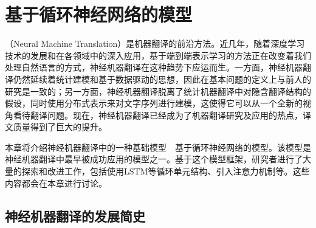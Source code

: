 
%


\renewcommand\figurename{图}%
\renewcommand\tablename{表}%


\chapter{基于循环神经网络的模型}

 （Neural Machine Translation）是机器翻译的前沿方法。近几年，随着深度学习技术的发展和在各领域中的深入应用，基于端到端表示学习的方法正在改变着我们处理自然语言的方式，神经机器翻译在这种趋势下应运而生。一方面，神经机器翻译仍然延续着统计建模和基于数据驱动的思想，因此在基本问题的定义上与前人的研究是一致的；另一方面，神经机器翻译脱离了统计机器翻译中对隐含翻译结构的假设，同时使用分布式表示来对文字序列进行建模，这使得它可以从一个全新的视角看待翻译问题。现在，神经机器翻译已经成为了机器翻译研究及应用的热点，译文质量得到了巨大的提升。

\parinterval 本章将介绍神经机器翻译中的一种基础模型\ \dash \ 基于循环神经网络的模型。该模型是神经机器翻译中最早被成功应用的模型之一。基于这个模型框架，研究者进行了大量的探索和改进工作，包括使用LSTM等循环单元结构、引入注意力机制等。这些内容都会在本章进行讨论。

\section{神经机器翻译的发展简史}


